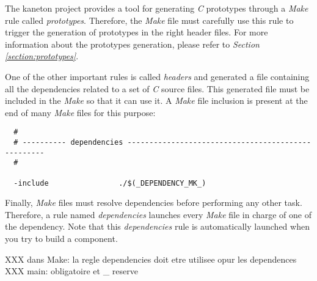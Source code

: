 The kaneton project provides a tool for generating \textit{C} prototypes
through a \textit{Make} rule called \textit{prototypes}. Therefore, the
\textit{Make} file must carefully use this rule to trigger the generation
of prototypes in the right header files. For more information about the
prototypes generation, please refer to \textit{Section
\ref{section:prototypes}}.

One of the other important rules is called \textit{headers} and generated
a file containing all the dependencies related to a set of \textit{C}
source files. This generated file must be included in the \textit{Make}
so that it can use it. A \textit{Make} file inclusion is present at the
end of many \textit{Make} files for this purpose:

\begin{verbatim}
  #
  # ---------- dependencies ---------------------------------------------------
  #

  -include                ./$(_DEPENDENCY_MK_)
\end{verbatim}

Finally, \textit{Make} files must resolve dependencies before performing
any other task. Therefore, a rule named \textit{dependencies} launches
every \textit{Make} file in charge of one of the dependency. Note that this
\textit{dependencies} rule is automatically launched when you try to
build a component.


XXX dans Make: la regle dependencies doit etre utilisee opur les dependences
XXX main: obligatoire et \_ reserve
